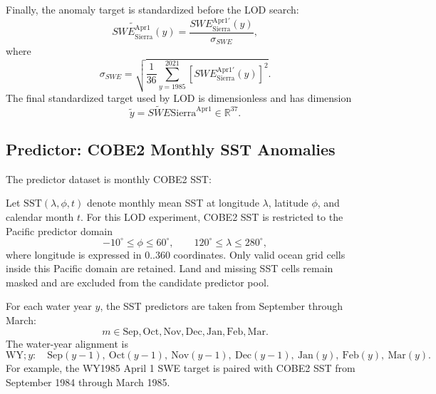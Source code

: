\documentclass[11pt]{article}
\newcommand{\sst}{\mathrm{SST}}
\begin{document}
Finally, the anomaly target is standardized before the LOD search:
\begin{equation}
\widetilde{SWE_{\mathrm{Sierra}}^{\mathrm{Apr1}}}(y)
=
\frac{
SWE_{\mathrm{Sierra}}^{\mathrm{Apr1}\prime}(y)
}{
\sigma_{SWE}
},
\label{eq:swe_apr1_standardized}
\end{equation}
where
\begin{equation}
\sigma_{SWE}
=
\sqrt{
\frac{1}{36}
\sum_{y=1985}^{2021}
\left[
SWE_{\mathrm{Sierra}}^{\mathrm{Apr1}\prime}(y)
\right]^2
}.
\label{eq:swe_apr1_std}
\end{equation}
The final standardized target used by LOD is dimensionless and has dimension
\begin{equation}
\widetilde{y}
=
\widetilde{SWE}{\mathrm{Sierra}}^{\mathrm{Apr1}}
\in \mathbb{R}^{37}.
\label{eq:lod_target_dim}
\end{equation}

\subsection{Predictor: COBE2 Monthly SST Anomalies}
\label{subsec:cobe2_sst_lod_predictor}

The predictor dataset is monthly COBE2 SST:
\begin{quote}
\end{quote}
Let $\sst(\lambda,\phi,t)$ denote monthly mean SST at longitude $\lambda$, latitude $\phi$, and
calendar month $t$. For this LOD experiment, COBE2 SST is restricted to the Pacific predictor
domain
\begin{equation}
-10^\circ \leq \phi \leq 60^\circ,
\qquad
120^\circ \leq \lambda \leq 280^\circ,
\label{eq:cobe2_sst_lod_pacific_domain}
\end{equation}
where longitude is expressed in $0..360$ coordinates. Only valid ocean grid cells inside this
Pacific domain are retained. Land and missing SST cells remain masked and are excluded from the
candidate predictor pool.

For each water year $y$, the SST predictors are taken from September through March:
\begin{equation}
m \in
{\mathrm{Sep}, \mathrm{Oct}, \mathrm{Nov}, \mathrm{Dec}, \mathrm{Jan}, \mathrm{Feb}, \mathrm{Mar}}.
\end{equation}
The water-year alignment is
\begin{equation}
\mathrm{WY}; y:
\quad
\mathrm{Sep}(y-1),\ \mathrm{Oct}(y-1),\ \mathrm{Nov}(y-1),\ \mathrm{Dec}(y-1),
\ \mathrm{Jan}(y),\ \mathrm{Feb}(y),\ \mathrm{Mar}(y).
\label{eq:sst_wy_alignment}
\end{equation}
For example, the WY1985 April 1 SWE target is paired with COBE2 SST from September 1984 through
March 1985.
\end{document}
